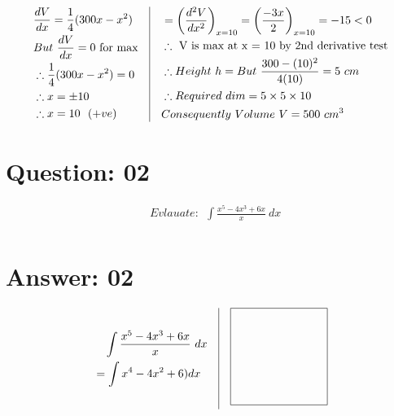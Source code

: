 \documentclass[17pt]{extarticle}
\begin{document}
\begin{fleqn}
\begin{equation} \nonumber
\begin{alignedat}{4}
& \frac{dV}{dx}=\frac{1}{4}(300x - x^2) \\
& But\  \frac{dV}{dx}= 0 \text{ for max}\\
& \therefore \frac{1}{4}(300x - x^2)=0\\
& \therefore x = \pm 10\\
& \therefore x = 10 \ \ (+ve)
\end{alignedat}
\quad
\vrule
\quad
\begin{alignedat}{4}
&= \left(\frac{d^2V}{dx^2}\right)_{x=10}=\left(\frac{-3x}{2}\right)_{x=10} = -15<0\\
& \therefore \text{ V is max at x = 10 by 2nd derivative test}\\
& \therefore Height\  h=But\  \frac{300 - (10)^2}{4(10)}= 5\ cm\\
& \therefore Required\  dim = 5 \times  5 \times 10 \\
& Consequently \ Volume\ V = 500 \ cm^3 \\
\end{alignedat}
\end{equation}

\section{Question: 02}

\begin{equation} \nonumber
\begin{alignedat}{4}
& Evlauate :\ \  \int \frac{x^5 - 4x^3 + 6x}{x}\ dx\\
\end{alignedat}
\end{equation}



\section{Answer: 02}

\begin{equation} \nonumber
\begin{alignedat}{4}
& \quad \int \frac{x^5 - 4x^3 + 6x}{x}\ dx\\
&= \int x^4 - 4x^2 +6)dx\\
\end{alignedat}
\quad
\vrule
\quad
\begin{alignedat}{4}
\begin{tikzpicture}
\draw (0,0) rectangle (3,3);
\end{tikzpicture}
\end{alignedat}
\end{equation}
\quad


\end{fleqn}
\end{document}

